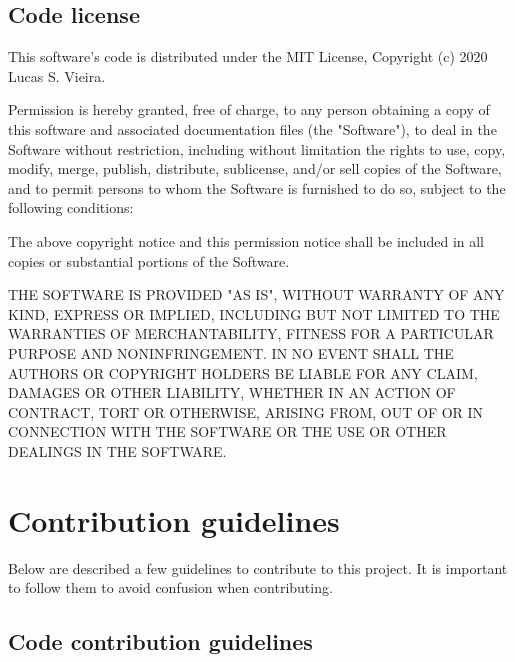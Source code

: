 \documentclass[openright,a4paper,twoside,12pt]{memoir}
\begin{document}
\subsection{Code license}
\label{sec:org132cfe4}

This software's code is distributed under the MIT License, Copyright
(c) 2020 Lucas S. Vieira.

Permission is hereby granted, free of charge, to any person obtaining
a copy of this software and associated documentation files (the
"Software"), to deal in the Software without restriction, including
without limitation the rights to use, copy, modify, merge, publish,
distribute, sublicense, and/or sell copies of the Software, and to
permit persons to whom the Software is furnished to do so, subject
to the following conditions:

The above copyright notice and this permission notice shall be
included in all copies or substantial portions of the Software.

THE SOFTWARE IS PROVIDED "AS IS", WITHOUT WARRANTY OF ANY KIND,
EXPRESS OR IMPLIED, INCLUDING BUT NOT LIMITED TO THE WARRANTIES OF
MERCHANTABILITY, FITNESS FOR A PARTICULAR PURPOSE AND
NONINFRINGEMENT. IN NO EVENT SHALL THE AUTHORS OR COPYRIGHT HOLDERS
BE LIABLE FOR ANY CLAIM, DAMAGES OR OTHER LIABILITY, WHETHER IN AN
ACTION OF CONTRACT, TORT OR OTHERWISE, ARISING FROM, OUT OF OR IN
CONNECTION WITH THE SOFTWARE OR THE USE OR OTHER DEALINGS IN THE
SOFTWARE.

\section{Contribution guidelines}
\label{sec:orgea64909}

Below are described a few guidelines to contribute to this project. It
is important to follow them to avoid confusion when contributing.

\subsection{Code contribution guidelines}
\label{sec:orgba3a656}
\end{document}
